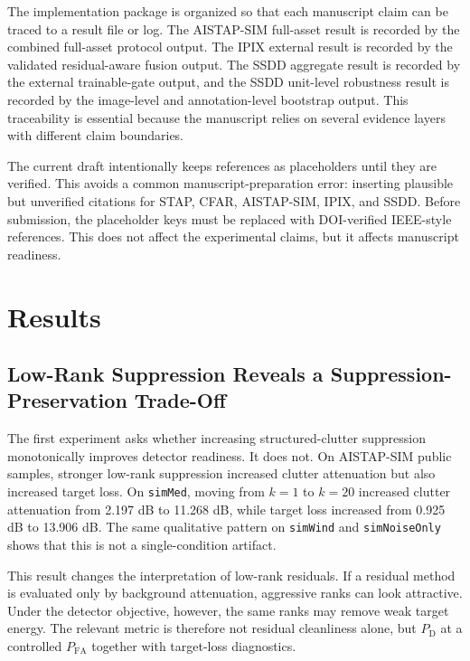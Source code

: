\documentclass[journal]{IEEEtran}
\begin{document}
The implementation package is organized so that each manuscript claim can be traced to a result file or log. The AISTAP-SIM full-asset result is recorded by the combined full-asset protocol output. The IPIX external result is recorded by the validated residual-aware fusion output. The SSDD aggregate result is recorded by the external trainable-gate output, and the SSDD unit-level robustness result is recorded by the image-level and annotation-level bootstrap output. This traceability is essential because the manuscript relies on several evidence layers with different claim boundaries.

The current draft intentionally keeps references as placeholders until they are verified. This avoids a common manuscript-preparation error: inserting plausible but unverified citations for STAP, CFAR, AISTAP-SIM, IPIX, and SSDD. Before submission, the placeholder keys must be replaced with DOI-verified IEEE-style references. This does not affect the experimental claims, but it affects manuscript readiness.

\section{Results}

\subsection{Low-Rank Suppression Reveals a Suppression-Preservation Trade-Off}

The first experiment asks whether increasing structured-clutter suppression monotonically improves detector readiness. It does not. On AISTAP-SIM public samples, stronger low-rank suppression increased clutter attenuation but also increased target loss. On \texttt{simMed}, moving from $k=1$ to $k=20$ increased clutter attenuation from 2.197 dB to 11.268 dB, while target loss increased from 0.925 dB to 13.906 dB. The same qualitative pattern on \texttt{simWind} and \texttt{simNoiseOnly} shows that this is not a single-condition artifact.

This result changes the interpretation of low-rank residuals. If a residual method is evaluated only by background attenuation, aggressive ranks can look attractive. Under the detector objective, however, the same ranks may remove weak target energy. The relevant metric is therefore not residual cleanliness alone, but $P_{\mathrm{D}}$ at a controlled $P_{\mathrm{FA}}$ together with target-loss diagnostics.
\end{document}
